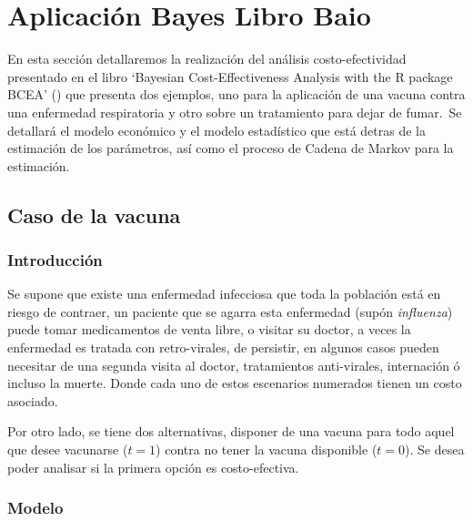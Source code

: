 \documentclass[12pt]{article}
\begin{document}
\section{Aplicación Bayes Libro Baio}

En esta sección detallaremos la realización del análisis costo-efectividad presentado en el libro `Bayesian Cost-Effectiveness Analysis with the R package BCEA' (\cite{baio_bayesian_2017}) que presenta dos ejemplos, uno para la aplicación de una vacuna contra una enfermedad respiratoria y otro sobre un tratamiento para dejar de fumar.\
Se detallará el modelo económico y el modelo estadístico que está detras de la estimación de los parámetros, así como el proceso de Cadena de Markov para la estimación.\\

\subsection{Caso de la vacuna}

\subsubsection{Introducción}

Se supone que existe una enfermedad infecciosa que toda la población está en riesgo de contraer, un paciente que se agarra esta enfermedad (supón \textit{influenza}) puede tomar medicamentos de venta libre, o visitar su doctor, a veces la enfermedad es tratada con retro-virales, de persistir, en algunos casos pueden necesitar de una segunda visita al doctor, tratamientos anti-virales, internación ó incluso la muerte. Donde cada uno de estos escenarios numerados tienen un costo asociado.

Por otro lado, se tiene dos alternativas, disponer de una vacuna para todo aquel que desee vacunarse ($t=1$) contra no tener la vacuna disponible ($t=0$). Se desea poder analisar si la primera opción es costo-efectiva.\\

\subsubsection{Modelo}
\end{document}
